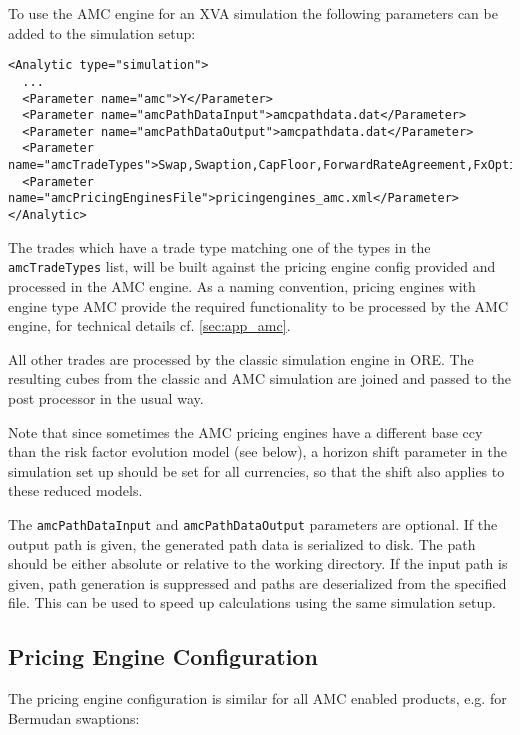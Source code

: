 \documentclass[12pt, a4paper]{article}
\begin{document}
To use the AMC engine for an XVA simulation the following parameters can be added to the simulation setup:

\begin{verbatim}
<Analytic type="simulation">
  ...
  <Parameter name="amc">Y</Parameter>
  <Parameter name="amcPathDataInput">amcpathdata.dat</Parameter>
  <Parameter name="amcPathDataOutput">amcpathdata.dat</Parameter>
  <Parameter name="amcTradeTypes">Swap,Swaption,CapFloor,ForwardRateAgreement,FxOption,BermudanSwaption</Parameter>
  <Parameter name="amcPricingEnginesFile">pricingengines_amc.xml</Parameter>
</Analytic>
\end{verbatim}

The trades which have a trade type matching one of the types in the \verb+amcTradeTypes+ list, will be built against the
pricing engine config provided and processed in the AMC engine. As a naming convention, pricing engines with engine type
AMC provide the required functionality to be processed by the AMC engine, for technical details cf. \ref{sec:app_amc}.

All other trades are processed by the classic simulation engine in ORE. The resulting cubes from the classic and AMC
simulation are joined and passed to the post processor in the usual way.

Note that since sometimes the AMC pricing engines have a different base ccy than the risk factor evolution model (see
below), a horizon shift parameter in the simulation set up should be set for all currencies, so that the shift also
applies to these reduced models.

The \verb+amcPathDataInput+ and \verb+amcPathDataOutput+ parameters are optional. If the output path is given, the
generated path data is serialized to disk. The path should be either absolute or relative to the working directory. If
the input path is given, path generation is suppressed and paths are deserialized from the specified file. This can be
used to speed up calculations using the same simulation setup.

\subsection{Pricing Engine Configuration}\label{sec:pricing_engine_config}

The pricing engine configuration is similar for all AMC enabled products, e.g. for Bermudan swaptions:
\end{document}
